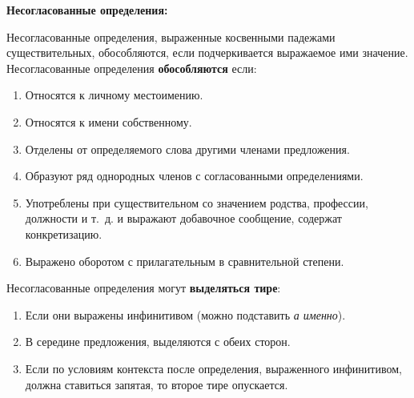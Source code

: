 \documentclass[main]{subfiles}
\begin{document}
\textbf{Несогласованные определения:}

Несогласованные определения, выраженные косвенными падежами существительных, обособляются, если подчеркивается выражаемое ими значение. \newline
{} \newline
Несогласованные определения \textbf{обособляются} если:
\begin{enumerate}
      \item Относятся к личному местоимению. \newline
      \item Относятся к имени собственному. \newline
      \item Отделены от определяемого слова другими членами предложения. \newline
      \item Образуют ряд однородных членов с согласованными определениями. \newline
      \item Употреблены при существительном со значением родства, профессии, должности и т.~д. и выражают добавочное сообщение, содержат конкретизацию. \newline
      \item Выражено оборотом с прилагательным в сравнительной степени. \newline
\end{enumerate}
Несогласованные определения могут \textbf{выделяться тире}:
\begin{enumerate}
      \item Если они выражены инфинитивом (можно подставить \textit{а именно}).\newline
      \item В середине предложения, выделяются с обеих сторон.
      \item Если по условиям контекста после определения, выраженного инфинитивом, должна ставиться запятая, то второе тире опускается. \newline
\end{enumerate}
\end{document}

